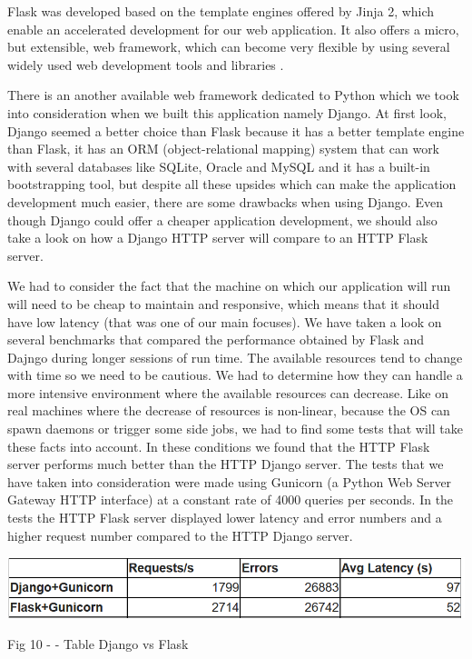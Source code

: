 \documentclass[12pt, a4paper]{report}
\begin{document}
Flask was developed based on the template engines offered by Jinja 2, which enable an accelerated development for our web application. It also offers a micro, but extensible, web framework, which can become very flexible by using several widely used web development tools and libraries \cite{Flask1}.
\par 

There is an another available web framework dedicated to Python which we took into consideration when we built this application namely Django. At first look, Django seemed a better choice than Flask because it has a better template engine than Flask, it has an ORM (object-relational mapping) system that can work with several databases like SQLite, Oracle and MySQL and it has a built-in bootstrapping tool, but despite all these upsides which can make the application development much easier, there are some drawbacks when using Django. Even though Django could offer a cheaper application development, we should also take a look on how a Django HTTP server will compare to an HTTP Flask server.
\par 

We had to consider the fact that the machine on which our application will run will need to be cheap to maintain and responsive, which means that it should have low latency (that was one of our main focuses). We have taken a look on several benchmarks that compared the performance obtained by Flask and Dajngo during longer sessions of run time. The available resources tend to change with time so we need to be cautious. We had to determine how they can handle a more intensive environment where the available resources can decrease. Like on real machines where the decrease of resources is non-linear, because the OS can spawn daemons or trigger some side jobs, we had to find some tests that will take these facts into account. In these conditions we found that the HTTP Flask server performs much better than the HTTP Django server. The tests that we have taken into consideration \cite{Flask2} were made using Gunicorn (a Python Web Server Gateway HTTP interface) at a constant rate of 4000 queries per seconds. In the tests the HTTP Flask server displayed lower latency and error numbers and a higher request number compared to the HTTP Django server.
\par 

\bigskip
\includegraphics[scale=0.7, center]{django-flask-table.png}
\begin{center}
Fig 10 - \cite{Flask2} - Table Django vs Flask 
\end{center}
\end{document}
